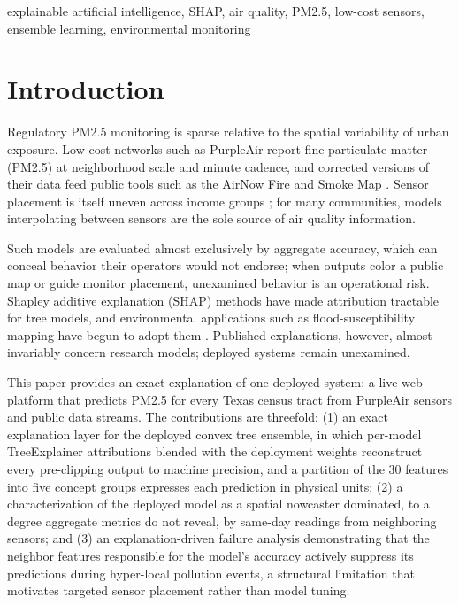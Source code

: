 \documentclass[conference]{IEEEtran}
\begin{document}
\begin{IEEEkeywords}
explainable artificial intelligence, SHAP, air quality, PM2.5, low-cost
sensors, ensemble learning, environmental monitoring
\end{IEEEkeywords}

\section{Introduction}
Regulatory PM2.5 monitoring is sparse relative to the spatial
variability of urban exposure. Low-cost networks such as PurpleAir report
fine particulate matter (PM2.5) at neighborhood scale and minute cadence,
and corrected versions of their data feed public tools such as the
AirNow Fire and Smoke Map \cite{barkjohn2021}. Sensor placement is itself
uneven across income groups \cite{desouza2021}; for many communities,
models interpolating between sensors are the sole source of air quality
information.

Such models are evaluated almost exclusively by aggregate accuracy,
which can conceal behavior their operators would not endorse; when
outputs color a public map or guide monitor placement, unexamined
behavior is an operational risk. Shapley additive explanation (SHAP)
methods \cite{lundberg2017, lundberg2020} have made attribution
tractable for tree models, and environmental applications such as
flood-susceptibility mapping have begun to adopt them \cite{choubin2025}.
Published explanations, however, almost invariably concern research
models; deployed systems remain unexamined.

This paper provides an exact explanation of one deployed system: a live
web platform that predicts PM2.5 for every Texas census tract from
PurpleAir sensors and public data streams. The contributions are
threefold: (1) an exact explanation layer for the
deployed convex tree ensemble, in which per-model TreeExplainer
attributions blended with the deployment weights reconstruct every
pre-clipping output to machine precision, and a partition of the 30
features into five concept groups expresses each prediction in physical
units; (2) a characterization of the deployed model as a spatial
nowcaster dominated, to a degree aggregate metrics do not reveal, by
same-day readings from neighboring sensors; and (3) an
explanation-driven failure analysis demonstrating that the neighbor
features responsible for the model's accuracy actively suppress its
predictions during hyper-local pollution events, a structural limitation
that motivates targeted sensor placement rather than model tuning.
\end{document}
